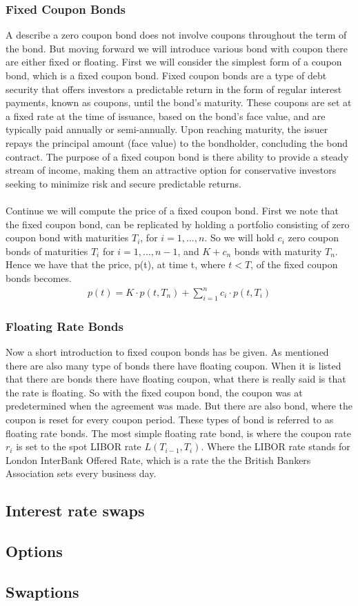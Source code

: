 \subsubsection{Fixed Coupon Bonds}
A describe a zero coupon bond does not involve coupons throughout the term of the bond. 
But moving forward we will introduce various bond with coupon there are either fixed 
or floating. First we will consider the simplest form of a coupon bond, which is a 
fixed coupon bond. Fixed coupon bonds are a type of debt security that offers investors a predictable
return in the form of regular interest payments, known as coupons, until the bond's maturity.
These coupons are set at a fixed rate at the time of issuance, based on the bond's face value,
and are typically paid annually or semi-annually. Upon reaching maturity, the issuer repays 
the principal amount (face value) to the bondholder, concluding the bond contract. The purpose
of a fixed coupon bond is there ability to provide a steady stream of income,
making them an attractive option for conservative investors seeking to minimize risk and 
secure predictable returns.
\\\\
Continue we will compute the price of a fixed coupon bond. First we note that the fixed coupon bond,
can be replicated by holding a portfolio consisting of zero coupon bond with maturities $T_i$, for 
$i=1,...,n$. So we will hold $c_i$ zero coupon bonds of maturities $T_i$ for $i=1,...,n-1$, and 
$K+c_n$ bonds with maturity $T_n$. Hence we have that the price, p(t), at time t, where $t<T$, of 
the fixed coupon bonds becomes. \cite{Bjork}
\begin{align*}
    p(t) = K \cdot p(t,T_n) + \sum_{i=1}^{n}c_i \cdot p(t,T_i)
\end{align*}
\subsubsection{Floating Rate Bonds}
Now a short introduction to fixed coupon bonds has be given. As mentioned there are also many 
type of bonds there have floating coupon. When it is listed that there are bonds there have
floating coupon, what there is really said is that the rate is floating. So with the fixed coupon
bond, the coupon was at predetermined when the agreement was made. But there are also bond, where
the coupon is reset for every coupon period. These types of bond is referred to as floating 
rate bonds. The most simple floating rate bond, is where the coupon rate $r_i$ is set to 
the spot LIBOR rate $L(T_{i-1}, T_i)$. Where the LIBOR rate stands for London InterBank
Offered Rate, which is a rate the the British Bankers Association sets every business day.
\subsection{Interest rate swaps}


\subsection{Options}

\subsection{Swaptions}